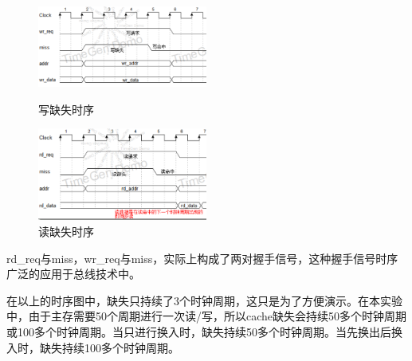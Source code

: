 \documentclass{ctexart}
\begin{document}
\begin{figure}[H]
    \begin{minipage}[t]{0.5\linewidth}
        \centering
        \includegraphics[width=2.2in]{xqs.png}
        \caption{写缺失时序}
        \label{fig:side:a1}
    \end{minipage}%
    \begin{minipage}[t]{0.5\linewidth}
        \centering
        \includegraphics[width=2.2in]{dqs.png}
        \caption{读缺失时序}
        \label{fig:side:b1}
    \end{minipage}
\end{figure}
\par
rd\_req与miss，wr\_req与miss，实际上构成了两对握手信号，这种握手信号时序广泛的应用于总线技术中。
\par 在以上的时序图中，缺失只持续了3个时钟周期，这只是为了方便演示。在本实验中，由于主存需要50个周期进行一次读/写，所以cache缺失会持续50多个时钟周期或100多个时钟周期。当只进行换入时，缺失持续50多个时钟周期。当先换出后换入时，缺失持续100多个时钟周期。
\end{document}

